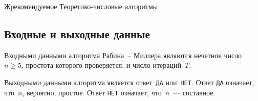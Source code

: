 \begin{appendix}{Ж}{рекомендуемое}
{Теоретико-числовые алгоритмы}\label{NT}

%
%
%
%
%
%
%

\label{PRIMEQ}

\subsection{Входные и выходные данные}

Входными данными алгоритма Рабина~-- Миллера
являются нечетное число~$n\geq 5$,
простота которого проверяется, и число итераций~$T$.

Выходными данными алгоритма является ответ~\texttt{ДА} или~\texttt{НЕТ}.
Ответ \texttt{ДА} означает, что~$n$, вероятно, простое.
Ответ \texttt{НЕТ} означает, что~$n$~--- составное.


\end{appendix}
